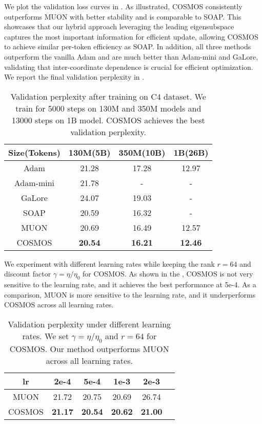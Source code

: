 \vskip2pt
We plot the validation loss curves in . 
As illustrated, COSMOS consistently outperforms MUON with better stability and is comparable to SOAP. 
This showcases that our hybrid approach leveraging the leading eigensubspace captures the most important information for efficient update, allowing COSMOS to achieve similar per-token efficiency as SOAP. 
In addition, all three methods outperform the vanilla Adam and are much better than Adam-mini and GaLore, validating that inter-coordinate dependence is crucial for efficient optimization. 
We report the final validation perplexity in . 

\begin{table}[htb!]
    \caption{Validation perplexity after training on C4 dataset. We train for 5000 steps on 130M and 350M models and 13000 steps on 1B model. COSMOS achieves the best validation perplexity. }
    \label{tab:exp-token}
    \centering
    \begin{tabular}{c|ccc}
    \toprule
    Size(Tokens) & 130M(5B) & 350M(10B) & 1B(26B) \\
    \hline
    Adam & 21.28&17.28 &12.97  \\
    Adam-mini &21.78 & - & - \\
    GaLore &24.07 &19.03 & - \\
    SOAP &20.59 &16.32 & - \\
    MUON &20.69 &16.49 &12.57 \\
    \hline
    COSMOS &{\bf 20.54} &{\bf 16.21} &{\bf 12.46}  \\
    \bottomrule
    \end{tabular}
\end{table}

\vskip2pt
We experiment with different learning rates while keeping the rank $r=64$ and discount factor $\gamma=\eta/\eta_0$ for COSMOS. 
As shown in the , COSMOS is not very sensitive to the learning rate, and it achieves the best performance at 5e-4. 
As a comparison, MUON is more sensitive to the learning rate, and it underperforms COSMOS across all learning rates. 

\begin{table}[htb!]
    \caption{Validation perplexity under different learning rates. We set $\gamma=\eta/\eta_0$ and $r=64$ for COSMOS. Our method outperforms MUON across all learning rates. }
    \label{tab:exp-130m-lr}
    \centering
    \begin{tabular}{c|ccccc}
    \toprule
    lr &2e-4 & 5e-4 & 1e-3 & 2e-3 & \\
    \hline
    MUON &21.72 & 20.75 & 20.69 & 26.74 \\
    COSMOS &{\bf 21.17} & {\bf 20.54} & {\bf 20.62} & {\bf 21.00}\\
    \bottomrule
    \end{tabular}
\end{table}

